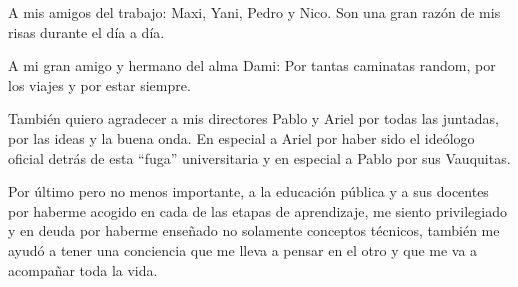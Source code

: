 A mis amigos del trabajo: Maxi, Yani, Pedro y Nico. Son una gran razón de mis risas durante el día a día. 

A mi gran amigo y hermano del alma Dami: Por tantas caminatas random, por los viajes y por estar siempre.

También quiero agradecer a mis directores Pablo y Ariel por todas las juntadas, por las ideas y la buena onda. En especial a Ariel por haber sido el ideólogo oficial detrás de esta ``fuga'' universitaria y en especial a Pablo por sus Vauquitas. 

Por último pero no menos importante, a la educación pública y a sus docentes por haberme acogido en cada de las etapas de aprendizaje, me siento privilegiado y en deuda por haberme enseñado no solamente conceptos técnicos, también me ayudó a tener una conciencia que me lleva a pensar en el otro y que me va a acompañar toda la vida.














